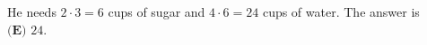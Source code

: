 He needs $2\cdot3=6$ cups of sugar and $4\cdot6=24$ cups of water. The answer is $\boxed{\textbf{(E) }24}$.

